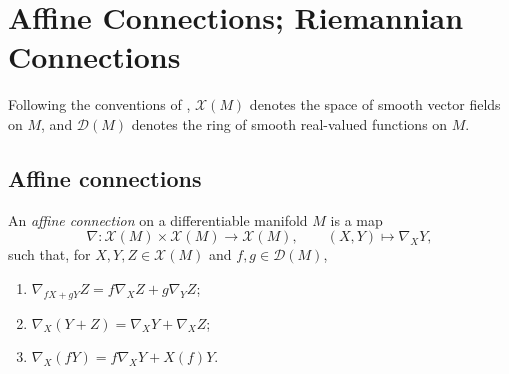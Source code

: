 \chapter{Affine Connections; Riemannian Connections}
\label{chap:dc-affine-connections-riemannian-connections}

Following the conventions of \cite{doCarmo}, $\mathcal{X}(M)$ denotes the space
of smooth vector fields on $M$, and $\mathcal{D}(M)$ denotes the ring of smooth
real-valued functions on $M$.

\section{Affine connections}

\begin{definition}
  \label{def:dc-ch2-2-1}


  An \emph{affine connection} on a differentiable manifold $M$ is a map
  \[
    \nabla\colon \mathcal{X}(M)\times\mathcal{X}(M)\longrightarrow\mathcal{X}(M),
    \qquad (X,Y)\longmapsto\nabla_XY,
  \]
  such that, for $X,Y,Z\in\mathcal{X}(M)$ and $f,g\in\mathcal{D}(M)$,
  \begin{enumerate}
    \item[(i)] $\nabla_{fX+gY}Z=f\nabla_XZ+g\nabla_YZ$;
    \item[(ii)] $\nabla_X(Y+Z)=\nabla_XY+\nabla_XZ$;
    \item[(iii)] $\nabla_X(fY)=f\nabla_XY+X(f)Y$.
  \end{enumerate}
\end{definition}

